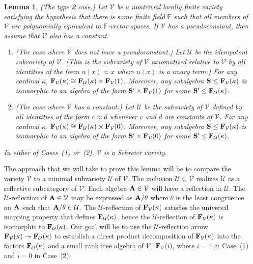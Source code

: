 \documentclass[12pt]{amsart}
\newtheorem{lm}[thm]{Lemma}
\theoremstyle{definition}
\numberwithin{equation}{section}
\newcommand{\m}[1]{{\mathbf{\uppercase{#1}}}}
\begin{document}
\begin{lm} \label{Vect_lm}
  \emph{(The type {\bf 2} case.)}
Let $\mathcal V$ be a nontrivial locally finite variety
satisfying the hypothesis that there is some
finite field $\mathbb{F}$ such that all members of $\mathcal{V}$ are
polynomially equivalent to $\mathbb{F}$-vector spaces.
If $\mathcal V$ has a pseudoconstant, then
assume that $\mathcal V$ also has a
constant.

\begin{enumerate}
\item \emph{(The case where $\mathcal V$ does not have a pseudoconstant.)}
Let $\mathcal U$ be the idempotent subvariety of $\mathcal V$.
(This is the subvariety of $\mathcal V$
axiomatized relative to $\mathcal V$ by all identities of the form
$u(x)\approx x$ where $u(x)$ is a unary term.)
For any cardinal $\kappa$,
$\m f_{\mathcal V}(\kappa)\cong \m f_{\mathcal U}(\kappa)\times 
\m f_{\mathcal V}(1)$. Moreover, any subalgebra
$\m s\leq \m f_{\mathcal V}(\kappa)$ is isomorphic
to an algebra of the form $\m s'\times \m f_{\mathcal V}(1)$
for some $\m s'\leq \m f_{\mathcal U}(\kappa)$.
\item \emph{(The case where $\mathcal V$ has a constant.)}
Let $\mathcal U$ be the subvariety of $\mathcal V$
defined by all identities of the form
$c\approx d$ whenever $c$ and $d$ are constants of $\mathcal{V}$.
For any cardinal $\kappa$,
$\m f_{\mathcal V}(\kappa)\cong \m f_{\mathcal U}(\kappa)\times 
\m f_{\mathcal V}(0)$. Moreover, any subalgebra
$\m s\leq \m f_{\mathcal V}(\kappa)$ is isomorphic
to an algebra of the form ${\m s}'\times \m f_{\mathcal V}(0)$
for some ${\m s}'\leq \m f_{\mathcal U}(\kappa)$.
\end{enumerate}

In either of Cases~(1) or~(2), $\mathcal V$ is a Schreier variety.
\end{lm}  

The approach that we will take to prove this lemma
will be to compare the variety $\mathcal{V}$
to a minimal subvariety $\mathcal{U}$ of $\mathcal{V}$.
The inclusion $\mathcal{U}\subseteq \mathcal{V}$
realizes $\mathcal{U}$ as a reflective subcategory of $\mathcal{V}$.
Each algebra $\m a\in\mathcal{V}$ will have
a reflection
in $\mathcal{U}$. The $\mathcal{U}$-reflection
of $\m a\in \mathcal{V}$ may be expressed as 
$\m a/\theta$ where $\theta$ is the least congruence
on $\m a$ such that $\m a/\theta\in\mathcal{U}$.
The $\mathcal{U}$-reflection of $\m f_{\mathcal{V}}(\kappa)$
satisfies the universal mapping property that
defines $\m f_{\mathcal{U}}(\kappa)$, hence
the $\mathcal{U}$-reflection of $\m f_{\mathcal{V}}(\kappa)$
is isomorphic to $\m f_{\mathcal{U}}(\kappa)$. Our goal will be to use
the $\mathcal{U}$-reflection arrow
$\m f_{\mathcal{V}}(\kappa)\twoheadrightarrow \m f_{\mathcal{U}}(\kappa)$
to establish
a direct product decomposition of 
$\m f_{\mathcal{V}}(\kappa)$ into the factors 
$\m f_{\mathcal{U}}(\kappa)$ and
a small rank free algebra of $\mathcal{V}$,
$\m f_{\mathcal{V}}(i)$, where $i=1$ in Case~(1)
and $i=0$ in Case~(2).
\end{document}
